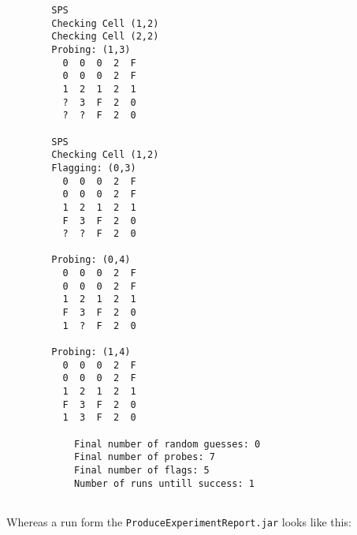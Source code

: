 \documentclass[british]{article}
\newcommand{\code}[1]{\texttt{#1}}
\begin{document}
\begin{lstlisting}
		SPS
		Checking Cell (1,2)
		Checking Cell (2,2)
		Probing: (1,3)
		  0  0  0  2  F
		  0  0  0  2  F
		  1  2  1  2  1
		  ?  3  F  2  0
		  ?  ?  F  2  0

		SPS
		Checking Cell (1,2)
		Flagging: (0,3)
		  0  0  0  2  F
		  0  0  0  2  F
		  1  2  1  2  1
		  F  3  F  2  0
		  ?  ?  F  2  0

		Probing: (0,4)
		  0  0  0  2  F
		  0  0  0  2  F
		  1  2  1  2  1
		  F  3  F  2  0
		  1  ?  F  2  0

		Probing: (1,4)
		  0  0  0  2  F
		  0  0  0  2  F
		  1  2  1  2  1
		  F  3  F  2  0
		  1  3  F  2  0

			Final number of random guesses: 0
			Final number of probes: 7
			Final number of flags: 5
			Number of runs untill success: 1


\end{lstlisting}
 Whereas a run form the \code{ProduceExperimentReport.jar} looks like this:
\end{document}
